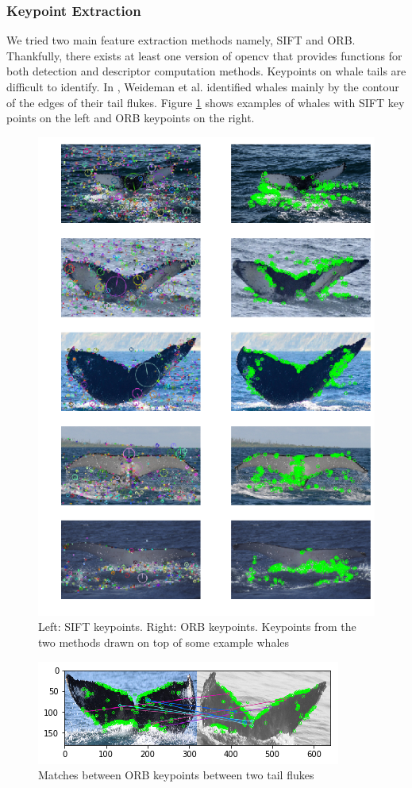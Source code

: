 \subsubsection{Keypoint Extraction}

We tried two main feature extraction methods namely, SIFT and ORB. Thankfully, there exists at least one version of opencv that provides functions for both detection and descriptor computation methods. Keypoints on whale tails are difficult to identify. In \cite{weideman2017integral}, Weideman et al. identified whales mainly by the contour of the edges of their tail flukes. Figure \ref{fig:whalekp} shows examples of whales with SIFT key points on the left and ORB keypoints on the right.

\begin{figure}[ht]
	\centering
	\includegraphics[width=.5\linewidth]{images/kp_side_by_side.png}
	\caption{\label{fig:whalekp}Left: SIFT keypoints. Right: ORB keypoints. Keypoints from the two methods drawn on top of some example whales}
\end{figure}
\begin{figure}[h]
	\centering
	\includegraphics[width=.8\linewidth]{images/orb_matches.png}
	\caption{\label{fig:orbmatch}Matches between ORB keypoints between two tail flukes}
\end{figure}

